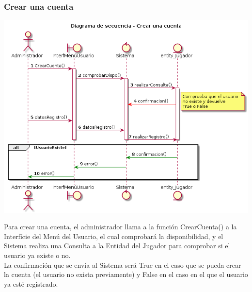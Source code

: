 \subsubsection{Crear una cuenta}
\begin{center}
  \includegraphics[width=1\textwidth]{./imatges/administrador/Crear_una_cuenta.png}
  \end{center}
  Para crear una cuenta, el administrador llama a la función CrearCuenta() a la Interfície del Menú del Usuario, el cual comprobará la disponibilidad, y el Sistema realiza una Consulta a la Entidad del Jugador para comprobar si el usuario ya existe o no. \\
  La confirmación que se envia al Sistema será True en el caso que se pueda crear la cuenta (el usuario no exista previamente) y False en el caso en el que el usuario ya esté registrado.
  \\
  
